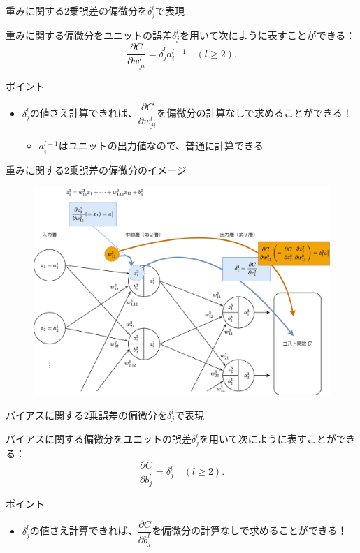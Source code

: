 \documentclass[dvipdfmx,aspectratio=169]{beamer}
\begin{document}
	\begin{frame}{重みに関する2乗誤差の偏微分を$ \delta^l_j $で表現}
		\begin{screen}
			重みに関する偏微分をユニットの誤差$ \delta^l_j $を用いて次にように表すことができる：
			\begin{equation}\label{eq:equation-expressing-the-partial-derivative-with-respect-to-the-weights-using-the-unit-error}
				\dfrac{\partial C}{\partial w^l_{ji}} = \delta^l_j a^{l-1}_i\quad (l \geq 2).
			\end{equation}
		\end{screen}
		\underline{ポイント}
		\begin{itemize}
			\item $ \delta^l_j $の値さえ計算できれば、$ \dfrac{\partial C}{\partial w^l_{ji}} $を偏微分の計算なしで求めることができる！
			\begin{itemize}
				\item $ a^{l-1}_i $はユニットの出力値なので、普通に計算できる
			\end{itemize}
		\end{itemize}
	\end{frame}
	\begin{frame}{重みに関する2乗誤差の偏微分のイメージ}
		\begin{figure}
			\centering
			\includegraphics[width=0.7\linewidth]{img/image-of-the-partial-derivative-of-the-squared-error-with-respect-to-the-weights}
		\end{figure}
	\end{frame}
	\begin{frame}{バイアスに関する2乗誤差の偏微分を$ \delta^l_j $で表現}
		\begin{screen}
			バイアスに関する偏微分をユニットの誤差$ \delta^l_j $を用いて次にように表すことができる：
			\begin{equation}\label{eq:equation-expressing-the-partial-derivative-with-respect-to-the-bias-using-the-unit-error}
				\dfrac{\partial C}{\partial b^l_j} = \delta^l_j\quad (l \geq 2).
			\end{equation}
		\end{screen}
		ポイント
		\begin{itemize}
			\item $ \delta^l_j $の値さえ計算できれば、$ \dfrac{\partial C}{\partial b^l_j} $を偏微分の計算なしで求めることができる！
		\end{itemize}
	\end{frame}
\end{document}
